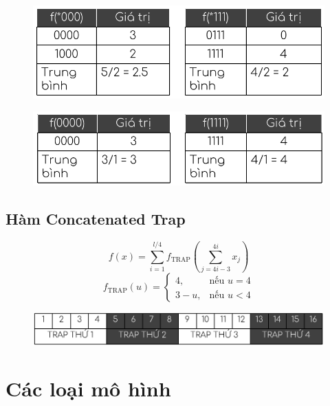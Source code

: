 \documentclass{book}
\begin{document}
        \begin{figure}[H]
            \centering
            \includegraphics[width=0.6\linewidth]{images/trapt3.png}
            \label{fig:trapt3}
        \end{figure}
        \begin{figure}[H]
            \centering
            \includegraphics[width=0.6\linewidth]{images/trapt4.png}
            \label{fig:trapt4}
        \end{figure}
        
        \subsection{Hàm Concatenated Trap}
        \[
        f(x) = \sum_{i=1}^{l/4} f_{\text{TRAP}}\left( \sum_{j=4i-3}^{4i} x_j \right)
        \]
        \[
        f_{\text{TRAP}}(u) =
        \begin{cases}
            4, & \text{nếu } u = 4 \\
            3 - u, & \text{nếu } u < 4
        \end{cases}
        \]
        \begin{figure}[H]
            \centering
            \includegraphics[width=0.8\linewidth]{images/contrap.png}
            \label{fig:contrap}
        \end{figure}
    
    \section{Các loại mô hình}
    
\end{document}
